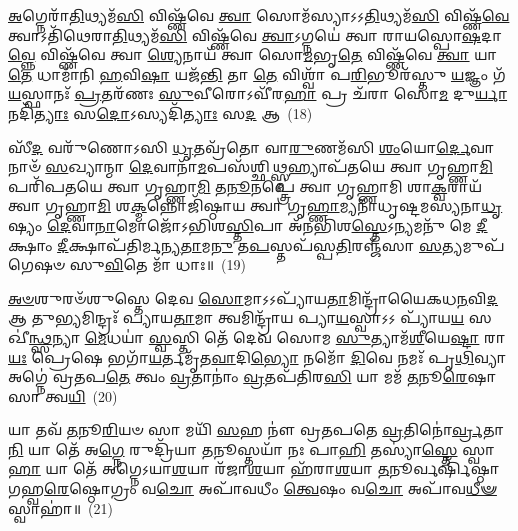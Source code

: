 {\anuvakamend[{\-\ul{𑌮𑌿}\-𑌤𑍍𑌰\-\ul{𑌸𑍍𑌯} 𑌤𑍍𑌰𑌯𑍋᳴𑌵𑌿𑍞𑌶𑌤𑌿𑌶𑍍𑌚}]}%

\-\ul{𑌅}\-𑌗𑍍𑌨𑍇𑌰𑌾᳴\-\ul{𑌤𑌿}\-𑌥𑍍𑌯𑌮᳴\-\ul{𑌸𑌿} 𑌵𑌿𑌷𑍍𑌣᳴𑌵𑍇 \ul{𑌤𑍍𑌵𑌾} 𑌸𑍋𑌮᳴𑌸𑍍𑌯𑌾\-𑌽\-𑌽\-\ul{𑌤𑌿}\-𑌥𑍍𑌯𑌮᳴\-\ul{𑌸𑌿} 𑌵𑌿𑌷𑍍𑌣᳴\-\ul{𑌵𑍇} 𑌤𑍍𑌵𑌾\-𑌽𑌤𑌿᳴𑌥𑍇𑌰𑌾\-\ul{𑌤𑌿}\-𑌥𑍍𑌯𑌮᳴\-\ul{𑌸𑌿} 𑌵𑌿𑌷𑍍𑌣᳴𑌵𑍇 \ul{𑌤𑍍𑌵𑌾}\-\-𑌽𑌗𑍍𑌨𑌯𑍇॑ 𑌤𑍍𑌵𑌾 𑌰𑌾𑌯𑌸𑍍𑌪𑍋\-\ul{𑌷}\-𑌦𑌾\-\ul{𑌵𑍍𑌨𑍍𑌨𑍇} 𑌵𑌿𑌷𑍍𑌣᳴𑌵𑍇 𑌤𑍍𑌵𑌾 \ul{𑌶𑍍𑌯𑍇}\-𑌨𑌾𑌯᳴ 𑌤𑍍𑌵𑌾 𑌸𑍋\-\ul{𑌮}\-𑌭𑍃\-\ul{𑌤𑍇} 𑌵𑌿𑌷𑍍𑌣᳴𑌵𑍇 \ul{𑌤𑍍𑌵𑌾} 𑌯𑌾 \ul{𑌤𑍇} 𑌧𑌾𑌮𑌾᳴𑌨𑌿 \ul{𑌹}\-𑌵𑌿\-\ul{𑌷𑌾} 𑌯𑌜᳴\-\ul{𑌨𑍍𑌤𑌿} 𑌤𑌾 \ul{𑌤𑍇} 𑌵𑌿𑌶𑍍𑌵𑌾᳴ 𑌪\-\ul{𑌰𑌿}\-𑌭𑍂𑌰᳴𑌸𑍍𑌤𑍁 \ul{𑌯}\-𑌜𑍍𑌞𑌂 𑌗᳴\-\ul{𑌯}\-𑌸𑍍𑌫𑌾𑌨𑌃᳴ \ul{𑌪𑍍𑌰}\-𑌤𑌰᳴𑌣𑌃 \ul{𑌸𑍁}\-𑌵𑍀𑌰𑍋\-𑌽𑌵𑍀᳴𑌰\-\ul{𑌹𑌾} 𑌪𑍍𑌰 𑌚᳴𑌰𑌾 𑌸𑍋\-\ul{𑌮} 𑌦𑍁\-\ul{𑌰𑍍𑌯𑌾}\-𑌨𑌦𑌿᳴\-\ul{𑌤𑍍𑌯𑌾𑌃} 𑌸\-\ul{𑌦𑍋}\-\-𑌽𑌸𑍍𑌯𑌦𑌿᳴\-\ul{𑌤𑍍𑌯𑌾𑌃} 𑌸\-\ul{𑌦} 𑌆~(18)

𑌸𑍀᳴\-\ul{𑌦} 𑌵𑌰𑍁᳴𑌣𑍋\-𑌽𑌸𑌿 \ul{𑌧𑍃}\-𑌤𑌵𑍍𑌰᳴𑌤𑍋 𑌵𑌾\-\ul{𑌰𑍁}\-𑌣𑌮᳴𑌸𑌿 \ul{𑌶𑌂}\-𑌯𑍋\-\ul{𑌰𑍍𑌦𑍇}\-𑌵𑌾𑌨𑌾𑍞᳴ \ul{𑌸}\-𑌖𑍍𑌯𑌾𑌨𑍍𑌮𑌾 \ul{𑌦𑍇}\-𑌵𑌾𑌨𑌾᳴\-\ul{𑌮}\-𑌪𑌸᳴𑌶𑍍𑌛𑌿\-\ul{𑌥𑍍𑌸𑍍𑌮}\-𑌹𑍍𑌯𑌾𑌪᳴𑌤𑌯𑍇 𑌤𑍍𑌵𑌾 𑌗𑍃𑌹𑍍𑌣𑌾\-\ul{𑌮𑌿} 𑌪𑌰𑌿᳴𑌪𑌤𑌯𑍇 𑌤𑍍𑌵𑌾 𑌗𑍃𑌹𑍍𑌣𑌾\-\ul{𑌮𑌿} 𑌤\-\ul{𑌨𑍂}\-𑌨𑌪𑍍𑌤𑍍𑌰𑍇॑ 𑌤𑍍𑌵𑌾 𑌗𑍃𑌹𑍍𑌣𑌾𑌮𑌿 𑌶𑌾\-\ul{𑌕𑍍𑌵}\-𑌰𑌾𑌯᳴ 𑌤𑍍𑌵𑌾 𑌗𑍃𑌹𑍍𑌣𑌾\-\ul{𑌮𑌿} 𑌶\-\ul{𑌕𑍍𑌮}\-𑌨𑍍𑌨𑍋𑌜𑌿᳴𑌷𑍍𑌠𑌾𑌯 𑌤𑍍𑌵𑌾 𑌗𑍃\-\ul{𑌹𑍍𑌣𑌾}\-𑌮𑍍𑌯𑌨𑌾᳴𑌧𑍃𑌷𑍍𑌟𑌮\-𑌸𑍍𑌯𑌨𑌾\-\ul{𑌧𑍃}\-𑌷𑍍𑌯𑌂 \ul{𑌦𑍇}\-𑌵𑌾\-\ul{𑌨𑌾}\-𑌮𑍋𑌜𑍋᳴\-𑌽𑌭𑌿𑌶\-\ul{𑌸𑍍𑌤𑌿}\-𑌪𑌾 𑌅᳴𑌨𑌭𑌿𑌶\-\ul{𑌸𑍍𑌤𑍇}\-\-𑌽𑌨𑍍𑌯𑌮𑌨𑍁᳴ 𑌮𑍇 \ul{𑌦𑍀}\-𑌕𑍍𑌷𑌾𑌂 \ul{𑌦𑍀}\-𑌕𑍍𑌷𑌾𑌪᳴𑌤𑌿𑌰𑍍𑌮𑌨𑍍𑌯\-\ul{𑌤𑌾}\-𑌮\-\ul{𑌨𑍁} 𑌤\-\ul{𑌪}\-𑌸𑍍𑌤𑌪᳴𑌸𑍍𑌪\-\ul{𑌤𑌿}\-𑌰𑌞𑍍𑌜᳴𑌸𑌾 \ul{𑌸}\-𑌤𑍍𑌯𑌮𑍁𑌪᳴ 𑌗𑍇𑌷𑍞 𑌸𑍁\-\ul{𑌵𑌿}\-𑌤𑍇 𑌮𑌾᳴ 𑌧𑌾𑌃॥~(19)

{\anuvakamend[{𑌆 𑌮𑍈𑌕𑌂᳴ 𑌚}]}%

\-\ul{𑌅}\-\-\ul{𑍞}\-𑌶𑍁𑌰𑍞᳴𑌶𑍁𑌸𑍍𑌤𑍇 𑌦𑍇𑌵 \ul{𑌸𑍋}\-𑌮𑌾\-𑌽\-𑌽𑌪𑍍𑌯𑌾᳴𑌯\-\ul{𑌤𑌾}\-𑌮𑌿𑌨𑍍𑌦𑍍𑌰𑌾᳴𑌯𑍈𑌕𑌧\-\ul{𑌨}\-𑌵𑌿\-\ul{𑌦} 𑌆 𑌤𑍁\-\ul{𑌭𑍍𑌯}\-𑌮𑌿𑌨𑍍𑌦𑍍𑌰𑌃᳴ 𑌪𑍍𑌯𑌾𑌯\-\ul{𑌤𑌾}\-𑌮𑌾 𑌤𑍍𑌵𑌮𑌿𑌨𑍍𑌦𑍍𑌰𑌾᳴𑌯 𑌪𑍍𑌯𑌾\-\ul{𑌯}\-𑌸𑍍𑌵𑌾\-𑌽\-𑌽 𑌪𑍍𑌯𑌾᳴𑌯\-\ul{𑌯} 𑌸𑌖𑍀॑\-\ul{𑌨𑍍𑌥𑍍𑌸}\-𑌨𑍍𑌯𑌾 \ul{𑌮𑍇}\-𑌧𑌯𑌾॑ \ul{𑌸𑍍𑌵}\-𑌸𑍍𑌤𑌿 𑌤𑍇᳴ 𑌦𑍇𑌵 𑌸𑍋𑌮 \ul{𑌸𑍁}\-𑌤𑍍𑌯𑌾𑌮᳴\-\ul{𑌶𑍀}\-𑌯𑍇\-\ul{𑌷𑍍𑌟𑌾} 𑌰𑌾\-\ul{𑌯𑌃} 𑌪𑍍𑌰𑍇𑌷𑍇 𑌭𑌗𑌾᳴\-\ul{𑌯}\-𑌰𑍍𑌤𑌮𑍃᳴𑌤\-\ul{𑌵𑌾}\-𑌦𑌿\-\ul{𑌭𑍍𑌯𑍋} 𑌨𑌮𑍋᳴ \ul{𑌦𑌿}\-𑌵𑍇 𑌨𑌮𑌃᳴ 𑌪𑍃\-\ul{𑌥𑌿}\-𑌵𑍍𑌯𑌾 𑌅𑌗𑍍𑌨𑍇॑ 𑌵𑍍𑌰𑌤𑌪\-\ul{𑌤𑍇} 𑌤𑍍𑌵𑌂 \ul{𑌵𑍍𑌰}\-𑌤𑌾𑌨𑌾𑌂॑ \ul{𑌵𑍍𑌰}\-𑌤𑌪᳴𑌤𑌿𑌰\-\ul{𑌸𑌿} 𑌯𑌾 𑌮𑌮᳴ \ul{𑌤}\-𑌨𑍂\-\ul{𑌰𑍇}\-𑌷𑌾 𑌸𑌾 𑌤𑍍𑌵\-\ul{𑌯𑌿}\-~(20)

𑌯𑌾 𑌤𑌵᳴ \ul{𑌤}\-𑌨𑍂\-\ul{𑌰𑌿}\-𑌯𑍞 𑌸𑌾 𑌮𑌯𑌿᳴ \ul{𑌸}\-𑌹 𑌨𑍗॑ 𑌵𑍍𑌰𑌤𑌪𑌤𑍇 \ul{𑌵𑍍𑌰}\-𑌤𑌿𑌨𑍋॑\-\ul{𑌰𑍍𑌵𑍍𑌰}\-𑌤𑌾\-\ul{𑌨𑌿} 𑌯𑌾 𑌤𑍇᳴ 𑌅\-\ul{𑌗𑍍𑌨𑍇} 𑌰𑍁𑌦𑍍𑌰𑌿᳴𑌯𑌾 \ul{𑌤}\-𑌨𑍂𑌸𑍍𑌤𑌯𑌾᳴ 𑌨𑌃 𑌪𑌾\-\ul{𑌹𑌿} 𑌤𑌸𑍍𑌯𑌾॑\-\ul{𑌸𑍍𑌤𑍇} 𑌸𑍍𑌵𑌾\-\ul{𑌹𑌾} 𑌯𑌾 𑌤𑍇᳴ 𑌅𑌗𑍍𑌨𑍇\-𑌽𑌯𑌾\-\ul{𑌶}\-𑌯𑌾 𑌰᳴𑌜𑌾\-\ul{𑌶}\-𑌯𑌾 𑌹᳴𑌰𑌾\-\ul{𑌶}\-𑌯𑌾 \ul{𑌤}\-𑌨𑍂𑌰𑍍𑌵𑌰𑍍\mbox{}𑌷𑌿᳴𑌷𑍍𑌠𑌾 𑌗𑌹𑍍𑌵\-\ul{𑌰𑍇}\-𑌷𑍍𑌠𑍋𑌗𑍍𑌰𑌂 𑌵\-\ul{𑌚𑍋} 𑌅𑌪𑌾᳴𑌵𑌧𑍀𑌂 \ul{𑌤𑍍𑌵𑍇}\-𑌷𑌂 𑌵\-\ul{𑌚𑍋} 𑌅𑌪𑌾᳴𑌵\-\ul{𑌧𑍀}\-\-\ul{𑍟} 𑌸𑍍𑌵𑌾𑌹𑌾॑॥~(21)

{\anuvakamend[{𑌤𑍍𑌵𑌯𑌿᳴ 𑌚𑌤𑍍𑌵𑌾\-\ul{𑌰𑌿}\-\-\ul{𑍞}\-𑌶𑌚𑍍𑌚᳴}]}%

